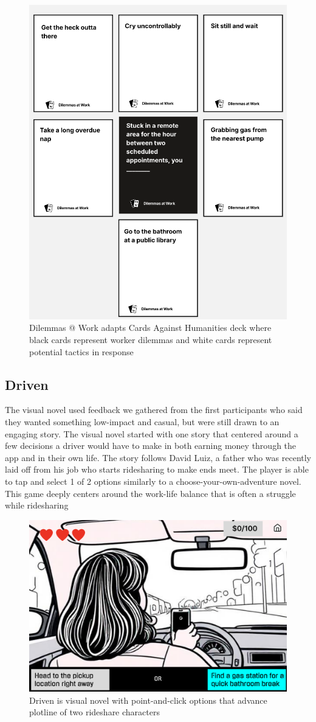 \FloatBarrier
\begin{figure}[h!]
    \centering
\includegraphics[width=.5\linewidth]{Chapters/figures/Dilemmas.png}
    \caption{Dilemmas @ Work adapts Cards Against Humanities deck where black cards represent worker dilemmas and white cards represent potential tactics in response}
    \label{crossroad}
\end{figure}
\FloatBarrier

\subsection{Driven} 
The visual novel used feedback we gathered from the first participants who said they wanted something low-impact and casual, but were still drawn to an engaging story.  The visual novel started with one story that centered around a few decisions a driver would have to make in both earning money through the app and in their own life. The story follows David Luiz, a father who was recently laid off from his job who starts ridesharing to make ends meet. The player is able to tap and select 1 of 2 options similarly to a choose-your-own-adventure novel. This game deeply centers around the work-life balance that is often a struggle while ridesharing 

\FloatBarrier
\begin{figure}[h!]
    \centering
\includegraphics[width=.7\linewidth]{Chapters/figures/driven.png}
    \caption{Driven is visual novel with point-and-click options that advance plotline of two rideshare characters}
    \label{crossroad}
\end{figure}
\FloatBarrier


